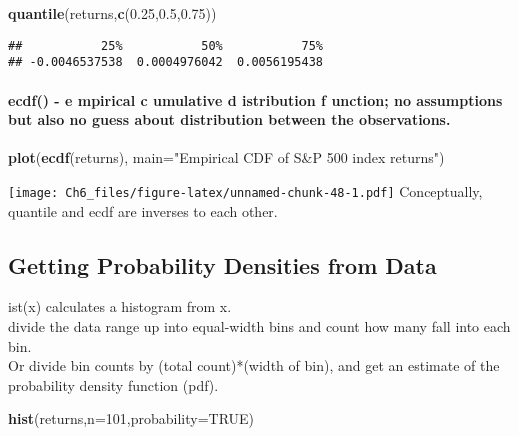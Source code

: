 \documentclass[
]{article}
\newenvironment{Shaded}{\begin{snugshade}}{\end{snugshade}}
\newcommand{\AttributeTok}[1]{\textcolor[rgb]{0.13,0.29,0.53}{#1}}
\newcommand{\ConstantTok}[1]{\textcolor[rgb]{0.56,0.35,0.01}{#1}}
\newcommand{\DecValTok}[1]{\textcolor[rgb]{0.00,0.00,0.81}{#1}}
\newcommand{\FloatTok}[1]{\textcolor[rgb]{0.00,0.00,0.81}{#1}}
\newcommand{\FunctionTok}[1]{\textcolor[rgb]{0.13,0.29,0.53}{\textbf{#1}}}
\newcommand{\NormalTok}[1]{#1}
\newcommand{\StringTok}[1]{\textcolor[rgb]{0.31,0.60,0.02}{#1}}
\begin{document}
\begin{Shaded}
\begin{Highlighting}[]
\FunctionTok{quantile}\NormalTok{(returns,}\FunctionTok{c}\NormalTok{(}\FloatTok{0.25}\NormalTok{,}\FloatTok{0.5}\NormalTok{,}\FloatTok{0.75}\NormalTok{))}
\end{Highlighting}
\end{Shaded}

\begin{verbatim}
##           25%           50%           75% 
## -0.0046537538  0.0004976042  0.0056195438
\end{verbatim}

\paragraph{ecdf() - e mpirical c umulative d istribution f unction; no
assumptions but also no guess about distribution between the
observations.}\label{ecdf---e-mpirical-c-umulative-d-istribution-f-unction-no-assumptions-but-also-no-guess-about-distribution-between-the-observations.}

\begin{Shaded}
\begin{Highlighting}[]
\FunctionTok{plot}\NormalTok{(}\FunctionTok{ecdf}\NormalTok{(returns), }\AttributeTok{main=}\StringTok{"Empirical CDF of S\&P 500 index returns"}\NormalTok{)}
\end{Highlighting}
\end{Shaded}

\texttt{[image: Ch6\_files/figure-latex/unnamed-chunk-48-1.pdf]}
Conceptually, quantile and ecdf are inverses to each other.

\subsection{Getting Probability Densities from
Data}\label{getting-probability-densities-from-data}

ist(x) calculates a histogram from x.\\
divide the data range up into equal-width bins and count how many fall
into each bin.\\
Or divide bin counts by (total count)*(width of bin), and get an
estimate of the probability density function (pdf).\\

\begin{Shaded}
\begin{Highlighting}[]
\FunctionTok{hist}\NormalTok{(returns,}\AttributeTok{n=}\DecValTok{101}\NormalTok{,}\AttributeTok{probability=}\ConstantTok{TRUE}\NormalTok{)}
\end{Highlighting}
\end{Shaded}
\end{document}
